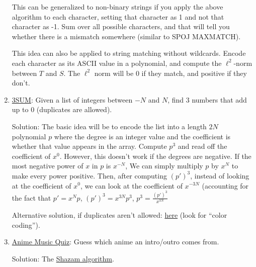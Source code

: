 \documentclass[11pt, oneside]{article}
\theoremstyle{plain}
\theoremstyle{definition}
\begin{document}
\begin{enumerate}
    This can be generalized to non-binary strings if you apply the above
    algorithm to each character, setting that character as 1 and not that
    character as -1. Sum over all possible characters, and that will tell you
    whether there is a mismatch somewhere (similar to SPOJ MAXMATCH).

    This idea can also be applied to string matching without wildcards.
    Encode each character as its ASCII value in a polynomial, and compute
    the \( \ell^2 \)-norm between \( T \) and \( S \). The \( \ell^2 \) norm
    will be 0 if they match, and positive if they don't.

  \item \href{https://en.wikipedia.org/wiki/3SUM}{3SUM}:
    Given a list of integers between \( -N \) and \( N \),
    find 3 numbers that add up to 0 (duplicates are allowed). 

    Solution: The basic idea will be to encode the list into a length \( 2N \)
    polynomial \( p \) where the degree is an integer value and the coefficient
    is whether that value appears in the array.
    Compute \( p^3 \) and read off the coefficient of \( x^0 \).
    However, this doesn't work if the degrees are negative. If the most negative
    power of \( x \) in \( p \) is \( x^{-N} \), We can simply multiply \( p \)
    by \( x^N \) to make every power positive. Then, after computing
    \( (p')^3 \), instead of looking at the coefficient of \( x^0 \), we can
    look at the coefficient of \( x^{-3N} \) (accounting for the fact that
    \( p' = x^N p \), \( (p')^3 = x^{3N} p^3 \),
    \( p^3 = \frac{(p')^3}{x^{3N}} \)

    Alternative solution, if duplicates aren't allowed:
    \href{https://cs.stanford.edu/~rishig/courses/ref/l16.txt}{here}
    (look for \enquote{color coding}).

  \item \href{https://animemusicquiz.com/}{Anime Music Quiz}:
    Guess which anime an intro/outro comes from.

    Solution: The \href{https://www.toptal.com/algorithms/shazam-it-music-processing-fingerprinting-and-recognition}
    {Shazam algorithm}.

\end{enumerate}

\newpage
\end{document}
